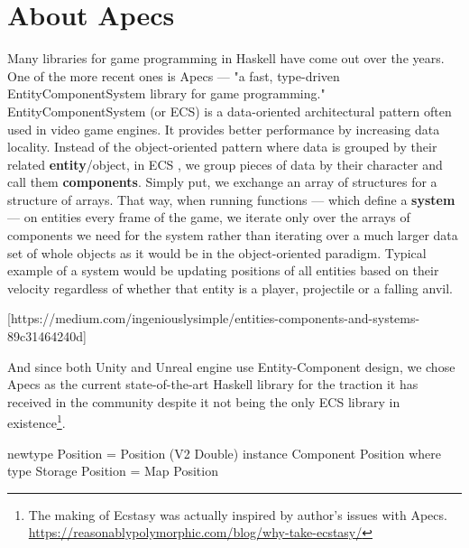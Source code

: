 \documentclass[
  digital, %
  table,   %
  twoside, %
  lof,     %
  lot,     %
]{fithesis3}
\begin{document}
\section{About Apecs}
Many libraries for game programming in Haskell have come out over the years.
One of the more recent ones is Apecs — "a fast, type-driven
Entity\textendash{}Component\textendash{}System library for game programming."\cite{apecsrepo}
Entity\textendash{}Component\textendash{}System (or ECS) is a data-oriented architectural pattern often
used in video game engines. It provides better performance
by increasing data locality. Instead of the object-oriented pattern
where data is grouped by their related \textbf{entity}/object, in ECS
, we group pieces of data by their character and call them \textbf{components}.
Simply put, we exchange an array of structures for a structure of arrays.
That way, when running functions — which define a \textbf{system} — on entities
every frame of the game, we iterate only over the arrays of components
we need for the system rather than iterating over a much
larger data set of whole objects as it would be in the object-oriented paradigm.
Typical example of a system would be updating positions of all entities
based on their velocity regardless of whether that entity is a player,
projectile or a falling anvil.

[https://medium.com/ingeniouslysimple/entities-components-and-systems-89c31464240d]

And since both Unity and Unreal engine use Entity-Component design,
we chose Apecs as the current state-of-the-art Haskell library
for the traction it has received in the community despite
it not being the only ECS library in existence\footnote{
The making of Ecstasy was actually inspired by author's issues with Apecs. \\
\url{https://reasonablypolymorphic.com/blog/why-take-ecstasy/}
}.

\begin{listing}
\label{lst:component}
\caption{Defining instance for \lstinline{Component}}
\begin{haskell}
newtype Position = Position (V2 Double)
instance Component Position where
    type Storage Position = Map Position
\end{haskell}
\end{listing}
\end{document}
